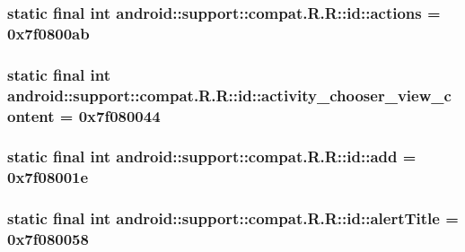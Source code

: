 \hypertarget{classandroid_1_1support_1_1compat_1_1_r_1_1id_6c7f9f38e5eec00a5d6ffb0d1e8b479a}{
\subsubsection[{actions}]{\setlength{\rightskip}{0pt plus 5cm}static final int android::support::compat.R.R::id::actions = 0x7f0800ab}}
\label{classandroid_1_1support_1_1compat_1_1_r_1_1id_6c7f9f38e5eec00a5d6ffb0d1e8b479a}


\hypertarget{classandroid_1_1support_1_1compat_1_1_r_1_1id_1d84c2a897fd54d0b1d36c2fa0644747}{
\subsubsection[{activity\_\-chooser\_\-view\_\-content}]{\setlength{\rightskip}{0pt plus 5cm}static final int android::support::compat.R.R::id::activity\_\-chooser\_\-view\_\-content = 0x7f080044}}
\label{classandroid_1_1support_1_1compat_1_1_r_1_1id_1d84c2a897fd54d0b1d36c2fa0644747}


\hypertarget{classandroid_1_1support_1_1compat_1_1_r_1_1id_c2103b2aeecc0076add166c04a6e9b30}{
\subsubsection[{add}]{\setlength{\rightskip}{0pt plus 5cm}static final int android::support::compat.R.R::id::add = 0x7f08001e}}
\label{classandroid_1_1support_1_1compat_1_1_r_1_1id_c2103b2aeecc0076add166c04a6e9b30}


\hypertarget{classandroid_1_1support_1_1compat_1_1_r_1_1id_7da2d9824f1909724d9bfe75034ce968}{
\subsubsection[{alertTitle}]{\setlength{\rightskip}{0pt plus 5cm}static final int android::support::compat.R.R::id::alertTitle = 0x7f080058}}
\label{classandroid_1_1support_1_1compat_1_1_r_1_1id_7da2d9824f1909724d9bfe75034ce968}


